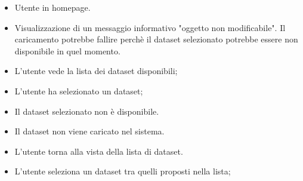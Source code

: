 \newpage

    \UCdsc
    { %
        \begin{itemize}
            \item Utente in homepage.
        \end{itemize}
    }
    { %
        \begin{itemize}
            \item  Visualizzazione di un messaggio informativo "oggetto non modificabile". Il caricamento potrebbe fallire perchè il dataset selezionato potrebbe essere
                    non disponibile in quel momento.
        \end{itemize}
    }
    { %
        \begin{itemize}
            \item L'utente vede la lista dei dataset disponibili;
            \item L'utente ha selezionato un dataset;
            \item Il dataset selezionato non è disponibile.
        \end{itemize}
    }
    { %
        \begin{itemize}
            \item Il dataset non viene caricato nel sistema.
            \item L'utente torna alla vista della lista di dataset.
        \end{itemize}
    }
    { %
        \begin{itemize}
            \item L'utente seleziona un dataset tra quelli proposti nella lista;
        \end{itemize}
    }



